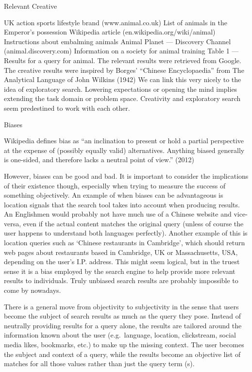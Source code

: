 Relevant	Creative

UK action sports lifestyle brand
(www.animal.co.uk)	List of animals in the Emperor’s possession
Wikipedia article
(en.wikipedia.org/wiki/animal)	Instructions about embalming animals
Animal Planet --- Discovery Channel (animal.discovery.com)	Information on a society for animal training
Table 1 --- Results for a query for animal. The relevant results were retrieved from Google. The creative results were inspired by Borges’ “Chinese Encyclopaedia” from The Analytical Language of John Wilkins (1942)
We can link this very nicely to the idea of exploratory search. Lowering expectations or opening the mind implies extending the task domain or problem space. Creativity and exploratory search seem predestined to work with each other.

Biases

Wikipedia defines bias as ``an inclination to present or hold a partial perspective at the expense of (possibly equally valid) alternatives. Anything biased generally is one-sided, and therefore lacks a neutral point of view.'' (2012)

However, biases can be good and bad. It is important to consider the implications of their existence though, especially when trying to measure the success of something objectively. An example of when biases can be advantageous is location signals that the search tool takes into account when producing results. An Englishmen would probably not have much use of a Chinese website and vice-versa, even if the actual content matches the original query (unless of course the user happens to understand both languages perfectly). Another example of this is location queries such as `Chinese restaurants in Cambridge', which should return web pages about restaurants based in Cambridge, UK or Massachusetts, USA, depending on the user’s I.P. address.  This might seem logical, but in the truest sense it is a bias employed by the search engine to help provide more relevant results to individuals. Truly unbiased search results are probably impossible to come by nowadays.

There is a general move from objectivity to subjectivity in the sense that users become the subject of search results as much as the query they pose. Instead of neutrally providing results for a query alone, the results are tailored around the information known about the user (e.g.\ language, location, clickstream, social media likes, bookmarks, etc.) to make up the missing context. The user becomes the subject and context of a query, while the results become an objective list of matches for all those values rather than just the query term (s).

